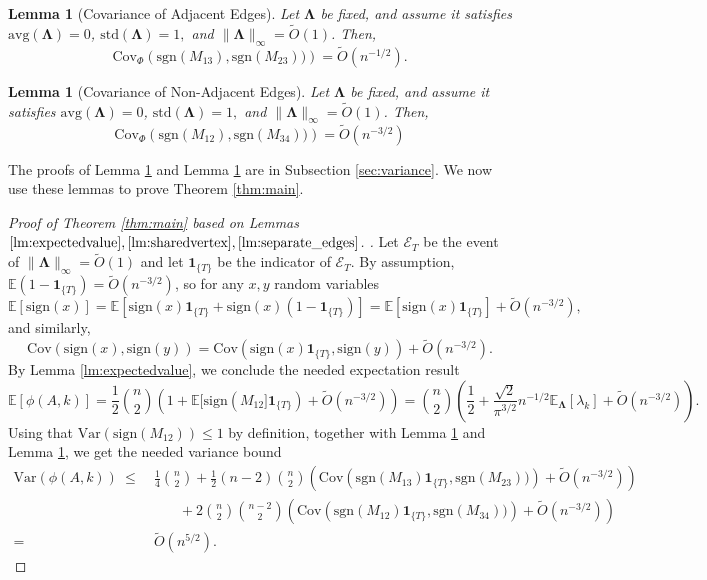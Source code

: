 \documentclass[reqno]{amsart}
\numberwithin{equation}{section}
\newcommand\E{\mathbb{E}}
\newcommand\rem{\tilde{O}\left(n^{-3/2}\right)}
\newcommand\on[1]{{\mathbf 1}_{\{#1\}}}
\newcommand{\av}{\mathrm{avg}}
\newcommand{\std}{\mathrm{std}}
\newcommand{\Var}{\mathrm{Var}}
\newcommand{\Cov}{\mathrm{Cov}}
\newtheorem{lemma}[theorem]{Lemma}
\begin{document}
\begin{lemma}[Covariance of Adjacent Edges]\label{lm:sharedvertex}
Let $\bm\Lambda$ be fixed, and assume it satisfies $\av(\bm\Lambda)=0$, $\std(\bm\Lambda)=1,$ and $\|\bm\Lambda\|_{\infty}=\tilde{O}(1)$. Then,  
$$ \Cov_{\Phi}\left( \mathrm{sgn}(M_{13}),\mathrm{sgn}(M_{23}))\right) = \tilde O(n^{-1/2}).$$
\end{lemma}
\begin{lemma}[Covariance of Non-Adjacent Edges]\label{lm:separate_edges}
Let $\bm\Lambda$ be fixed, and assume it satisfies $\av(\bm\Lambda)=0$, $\std(\bm\Lambda)=1,$ and $\|\bm\Lambda\|_{\infty}=\tilde{O}(1)$. Then,  
$$ \Cov_{\Phi}\left( \mathrm{sgn}(M_{12}),\mathrm{sgn}(M_{34}))\right) = \rem$$
\end{lemma}
The proofs of Lemma \ref{lm:separate_edges} and Lemma \ref{lm:sharedvertex} are in Subsection \ref{sec:variance}. We now use these lemmas to prove Theorem \ref{thm:main}.

\begin{proof}[Proof of Theorem \ref{thm:main} based on Lemmas $\ref{lm:expectedvalue},\ref{lm:sharedvertex},\ref{lm:separate_edges}$. ]
    Let $\mathcal{E}_{T}$ be the event of $\|\bm\Lambda\|_{\infty}=\tilde{O}(1)$ and let $\on{T}$ be the indicator of $\mathcal{E}_{T}$. By assumption, $\E(1-\on{T})=\rem$, so for any $x,y$ random variables
    \[\E[\mathrm{sign}(x)]= \E[\mathrm{sign}(x)\on{T}+\mathrm{sign}(x)(1-\on{T})]=\E[\mathrm{sign}(x)\on{T}]+\rem,\]
    and similarly, 
    \[\Cov\left(\mathrm{sign}(x),\mathrm{sign}(y)\right)=\Cov\left(\mathrm{sign}(x)\on{T},\mathrm{sign}(y)\right)+\rem.\]
    By Lemma \ref{lm:expectedvalue}, we conclude the needed expectation result
$$      \E[\phi(A,k)]=\frac{1}{2}{n \choose 2}\left(1+\E[\mathrm{sign}(M_{12}]\on{T})+\rem\right)={n \choose 2}\left(\frac{1}{2}+\frac{\sqrt{2}}{\pi^{3/2}}n^{-1/2}\E_{\bm\Lambda}[\lambda_{k}]+\rem\right).  
 $$ 
Using that $\Var(\mathrm{sign}(M_{12}))\le1$ by definition, together with Lemma \ref{lm:separate_edges} and Lemma \ref{lm:sharedvertex}, we get the needed variance bound
\begin{align*}
    \Var(\phi(A,k))\ \le &\  \frac{1}{4} {n \choose 2} + \frac{1}{2} (n-2) {n \choose 2}\left( \Cov\left( \mathrm{sgn}(M_{13})\on{T},\mathrm{sgn}(M_{23}))\right)+\rem\right)\\
    &\qquad+2 {n \choose 2} {n-2 \choose 2}\left( \Cov\left( \mathrm{sgn}(M_{12})\on{T},\mathrm{sgn}(M_{34}))\right)+\rem\right)\\
    = &\ \tilde{O}(n^{5/2}).
\end{align*}
\end{proof}
\end{document}
